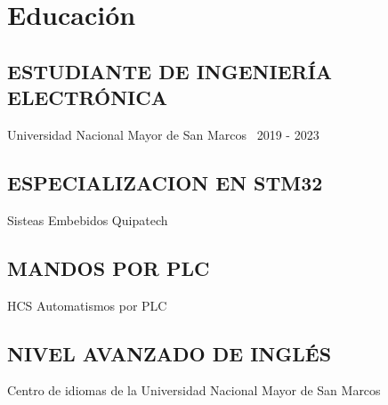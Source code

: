 \documentclass[12pt]{article}
\begin{document}
\begin{minipage}[t]{0.6\textwidth}
    \section{Educación}

      \subsection{ESTUDIANTE DE INGENIERÍA ELECTRÓNICA}
        Universidad Nacional Mayor de San Marcos \textbar\ 2019 - 2023

      \subsection{ESPECIALIZACION EN STM32}
        Sisteas Embebidos Quipatech

      \subsection{MANDOS POR PLC}
        HCS Automatismos por PLC

      \subsection{NIVEL AVANZADO DE INGLÉS}
        Centro de idiomas de la Universidad Nacional Mayor de San Marcos

  \end{minipage}
 
\end{document}
